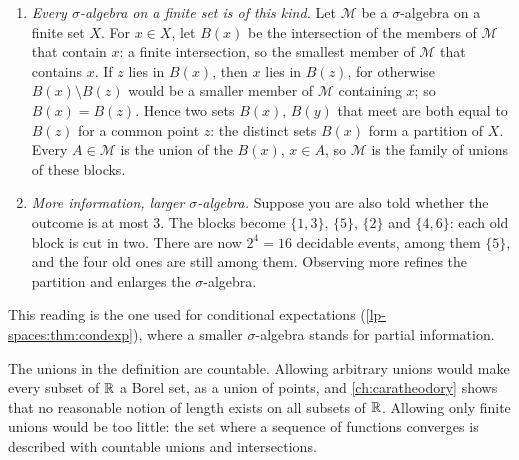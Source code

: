 \begin{notechapter}
\begin{example}
\begin{enumerate}[nosep]
        disjoint union of non-empty blocks $B_1, \dots, B_m$. A union of
        blocks is fixed by the choice of the blocks it contains, a
        subset of $\{1, \dots, m\}$, so there are $2^m$ of them ($4$ for
        the die). The complement of a union of blocks is the union of
        the other blocks, and a union of unions of blocks is a union of
        blocks: the unions of blocks form a $\sigma$-algebra. Every
        $\sigma$-algebra that contains the blocks contains their unions,
        so it is the $\sigma$-algebra generated by the blocks.
  \item \emph{Every $\sigma$-algebra on a finite set is of this kind.}
        Let $\mathcal M$ be a $\sigma$-algebra on a finite set $X$. For
        $x\in X$, let $B(x)$ be the intersection of the members of
        $\mathcal M$ that contain $x$: a finite intersection, so the
        smallest member of $\mathcal M$ that contains $x$. If $z$ lies
        in $B(x)$, then $x$ lies in $B(z)$, for otherwise
        $B(x)\setminus B(z)$ would be a smaller member of $\mathcal M$
        containing $x$; so $B(x) = B(z)$. Hence two sets $B(x)$, $B(y)$
        that meet are both equal to $B(z)$ for a common point $z$: the
        distinct sets $B(x)$ form a partition of $X$. Every
        $A\in\mathcal M$ is the union of the $B(x)$, $x\in A$, so
        $\mathcal M$ is the family of unions of these blocks.
  \item \emph{More information, larger $\sigma$-algebra.} Suppose you
        are also told whether the outcome is at most $3$. The blocks
        become $\{1, 3\}$, $\{5\}$, $\{2\}$ and $\{4, 6\}$: each old
        block is cut in two. There are now $2^4 = 16$ decidable events,
        among them $\{5\}$, and the four old ones are still among them.
        Observing more refines the partition and enlarges the
        $\sigma$-algebra.
\end{enumerate}
This reading is the one used for conditional expectations
(\cref{lp-spaces:thm:condexp}), where a smaller $\sigma$-algebra
stands for partial information.
\end{example}

\begin{pitfall}
The unions in the definition are countable. Allowing arbitrary unions
would make every subset of $\mathbb{R}$ a Borel set, as a union of points, and
\cref{ch:caratheodory} shows that no reasonable notion of length exists
on all subsets of $\mathbb{R}$. Allowing only finite unions would be too little:
the set where a sequence of functions converges is described with
countable unions and intersections.
\end{pitfall}


\end{notechapter}
